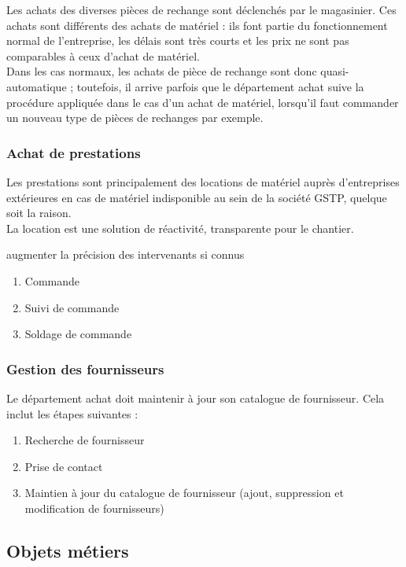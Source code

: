 \documentclass[a4paper]{article}
\begin{document}
Les achats des diverses pièces de rechange sont déclenchés par le magasinier.
Ces achats sont différents des achats de matériel : ils font partie du
fonctionnement normal de l'entreprise, les délais sont très courts et les
prix ne sont pas comparables à ceux d'achat de matériel.\\
Dans les cas normaux, les achats de pièce de rechange sont donc
quasi-automatique ; toutefois, il arrive parfois que le département achat
suive la procédure appliquée dans le cas d'un achat de matériel, lorsqu'il
faut commander un nouveau type de pièces de rechanges par exemple.


\subsubsection{Achat de prestations}

Les prestations sont principalement des locations de matériel auprès d'entreprises extérieures 
en cas de matériel indisponible au sein de la société GSTP, quelque soit la
raison.\\
La location est une solution de réactivité, transparente pour le chantier.

augmenter la
précision des intervenants si connus

\begin{enumerate}
\item Commande 
\item Suivi de commande
\item Soldage de commande
\end{enumerate}


\subsubsection{Gestion des fournisseurs}

Le département achat doit maintenir à jour son catalogue de fournisseur.
Cela inclut les étapes suivantes :
\begin{enumerate}
\item Recherche de fournisseur
\item Prise de contact
\item Maintien à jour du catalogue de fournisseur (ajout, suppression et
modification de fournisseurs)
\end{enumerate}


\subsection{Objets métiers}
\end{document}
